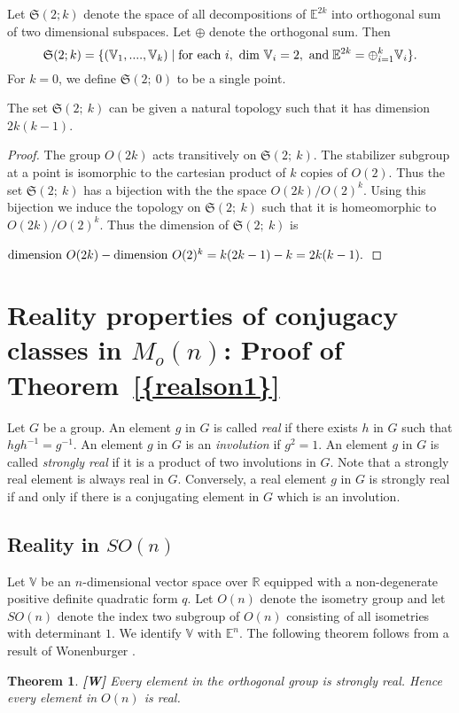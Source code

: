 \documentclass[11pt]{amsart}
\newtheorem{theorem}{Theorem}[section]
\theoremstyle{definition}
\theoremstyle{remark}
\numberwithin{equation}{section}
\theoremstyle{plain}
\begin{document}
 Let $\mathfrak S(2;k)$ denote the space of all decompositions of ${\mathbb E}^{2k}$ into orthogonal sum of two dimensional subspaces. Let $\oplus$ denote the orthogonal sum. Then 
$$\mathfrak S(2;k)=\{({\mathbb V}_1,....,{\mathbb V}_k)\;|\;\hbox{for each }i,\hbox{ dim }{\mathbb V}_i=2, \hbox{ and} \;{\mathbb E}^{2k}=\oplus_{i=1}^k{\mathbb V}_i\}.$$
For $k=0$, we define $\mathfrak S(2; \ 0)$ to be a single point. 

{\lemma The set $\mathfrak S (2; \ k)$ can be given a natural topology such that it has  dimension $2k(k-1)$.}
\begin{proof}
The group $O(2k)$ acts transitively
on $\mathfrak S(2; \ k)$. The stabilizer subgroup at a point is isomorphic
to the cartesian product of $k$ copies of $O(2)$. Thus the set $\mathfrak S(2; \ k)$ has a bijection with the the space $O(2k)/O(2)^k$. Using this bijection we induce the topology on $\mathfrak S(2; \ k)$ such that it is homeomorphic to $O(2k)/O(2)^k$. 
Thus the dimension of $\mathfrak S(2; \ k)$ is 

$\hbox{dimension }O(2k)- \hbox{dimension } 
O(2)^k=k(2k-1)-k=2k(k-1).$
\end{proof}

\section{Reality properties of conjugacy classes in $M_o(n)$: Proof of {Theorem~\ref{{realson1}}}}\label{real} 
Let $G$ be a group. An element $g$ in $G$ is called \emph{real} if there exists $h$ in $G$ such that $hgh^{-1}=g^{-1}$. An element $g$ in $G$ is an \emph{involution} if $g^2=1$. An element $g$ in $G$ is called \emph{strongly real} if it is a product of two involutions in $G$. Note that a strongly real element is always real in $G$. Conversely, a real element $g$ in $G$ is strongly real if and only if there is a conjugating element in $G$ which is an involution. 

\subsection{Reality in $SO(n)$}
Let ${\mathbb V}$ be an $n$-dimensional vector space over ${\mathbb R}$ equipped with a non-degenerate positive definite quadratic form $q$. Let $O(n)$ denote the isometry group and let $SO(n)$ denote the index two subgroup of $O(n)$ consisting of all isometries with determinant $1$. We identify ${\mathbb V}$ with ${\mathbb E}^n$. 
The following theorem follows from a result of Wonenburger \cite{w}.
\begin{theorem}\label{w}{\bf[W]}
 Every element in the orthogonal group is strongly real. Hence every element in $O(n)$ is real. 
\end{theorem}
\end{document}
